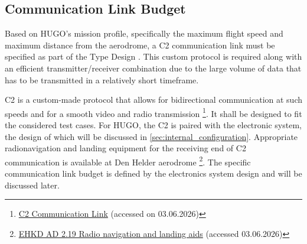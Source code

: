 \subsection{Communication Link Budget}
\label{sub:communication_link_budget}
Based on HUGO's mission profile, specifically the maximum flight speed and maximum distance from the aerodrome, a C2 communication link must be specified as part of the Type Design \cite{easa_light_uas_crd_is3}. This custom protocol is required along with an efficient transmitter/receiver combination due to the large volume of data that has to be transmitted in a relatively short timeframe.  %

C2 is a custom-made protocol that allows for bidirectional communication at such speeds and for a smooth video and radio transmission \footnote{\href{https://eudroneport.com/blog/c2-links/}{C2 Communication Link} (accessed on 03.06.2026)}. It shall be designed to fit the considered test cases. For HUGO, the C2 is paired with the electronic system, the design of which will be discussed in \autoref{sec:internal_configuration}. Appropriate radionavigation and landing equipment for the receiving end of C2 communication is available at Den Helder aerodrome \footnote{\href{https://eaip.lvnl.nl/web/eaip/AIRAC\%20AMDT\%2005-2026_2026_05_14/eAIP/EH-AD\%202\%20EHKD\%201-en-GB.html}{EHKD AD 2.19 Radio navigation and landing aids} (accessed 03.06.2026)}. The specific communication link budget is defined by the electronics system design and will be discussed later.

